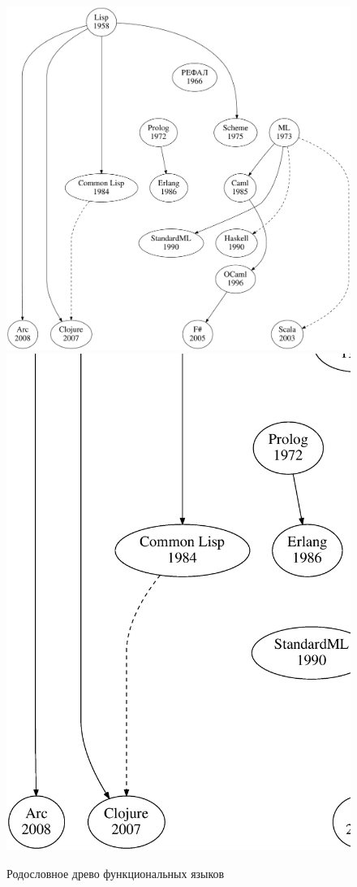 \documentclass[
  paper=a4,
  fontsize=14pt,
  openany,
  appendixprefix=true
]{scrbook}
\begin{document}
\begin{figure}[!t,lineage]
  \ifxetex
    \includegraphics[width=\textwidth]{languages.pdf}
  \else
    \includegraphics[width=\textwidth]{languages.ps}
  \fi
\caption{Родословное древо функциональных языков}
\label{lineage}
\end{figure}
\end{document}
